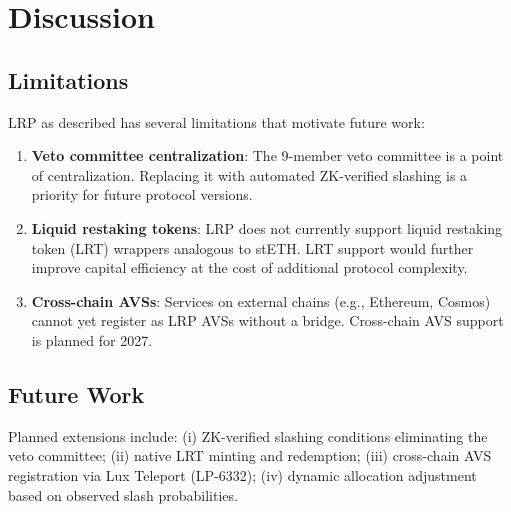 \section{Discussion}


\subsection{Limitations}

LRP as described has several limitations that motivate future work:

\begin{enumerate}[leftmargin=1.5em]
  \item \textbf{Veto committee centralization}: The 9-member veto committee is a point of
    centralization. Replacing it with automated ZK-verified slashing is a priority for
    future protocol versions.
  \item \textbf{Liquid restaking tokens}: LRP does not currently support liquid restaking
    token (LRT) wrappers analogous to stETH. LRT support would further improve capital
    efficiency at the cost of additional protocol complexity.
  \item \textbf{Cross-chain AVSs}: Services on external chains (e.g., Ethereum, Cosmos)
    cannot yet register as LRP AVSs without a bridge. Cross-chain AVS support is planned
    for 2027.
\end{enumerate}

\subsection{Future Work}

Planned extensions include: (i) ZK-verified slashing conditions eliminating the veto
committee; (ii) native LRT minting and redemption; (iii) cross-chain AVS registration
via Lux Teleport (LP-6332); (iv) dynamic allocation adjustment based on observed slash probabilities.

